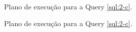 \documentclass[a4paper,12pt]{article}
\begin{document}
\begin{figure}[hpt]
   \begin{center}
   \end{center}
   \caption{Plano de execução para a Query \ref{sql:2-c}.}
   \label{fig:plano_2-c}
\end{figure}

\begin{figure}[hpt]
   \begin{center}
      \ContinuedFloat
   \end{center}
   \caption{Plano de execução para a Query \ref{sql:2-c}.}
\end{figure}
\end{document}
